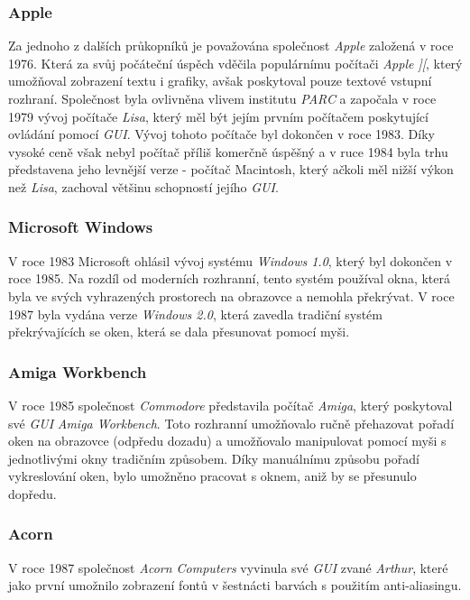 \documentclass[11pt,twoside,a4paper]{book}
\begin{document}
{\subsubsection{Apple}
Za jednoho z dalších průkopníků je považována společnost \textit{Apple} založená v roce 1976. Která za svůj počáteční úspěch vděčila populárnímu počítači \textit{Apple ][}, který umožňoval zobrazení textu i grafiky, avšak poskytoval pouze textové vstupní rozhraní. Společnost byla ovlivněna vlivem institutu \textit{PARC} a započala v roce 1979 vývoj počítače \textit{Lisa}, který měl být jejím prvním počítačem poskytující ovládání pomocí \textit{GUI}. Vývoj tohoto počítače byl dokončen v roce 1983. Díky vysoké ceně však nebyl počítač příliš komerčně úspěšný a v ruce 1984 byla trhu představena jeho levnější verze - počítač Macintosh, který ačkoli měl nižší výkon než \textit{Lisa}, zachoval většinu schopností jejího \textit{GUI}.
\subsubsection{Microsoft Windows}
V roce 1983 Microsoft ohlásil vývoj systému \textit{Windows 1.0}, který byl dokončen v roce 1985. Na rozdíl od moderních rozhranní, tento systém používal okna, která byla ve svých vyhrazených prostorech na obrazovce a nemohla překrývat. V roce 1987 byla vydána verze \textit{Windows 2.0}, která zavedla tradiční systém překrývajících se oken, která se dala přesunovat pomocí myši.
\subsubsection{Amiga Workbench}
V roce 1985 společnost \textit{Commodore} představila počítač \textit{Amiga}, který poskytoval své \textit{GUI} \textit{Amiga Workbench}. Toto rozhranní umožňovalo ručně přehazovat pořadí oken na obrazovce (odpředu dozadu) a umožňovalo manipulovat pomocí myši s jednotlivými okny tradičním způsobem. Díky manuálnímu způsobu pořadí vykreslování oken, bylo umožněno pracovat s oknem, aniž by se přesunulo dopředu.

\subsubsection{Acorn}
V roce 1987 společnost \textit{Acorn Computers} vyvinula své \textit{GUI} zvané \textit{Arthur}, které jako první umožnilo zobrazení fontů v šestnácti barvách s použitím anti-aliasingu.

}
\end{document}
